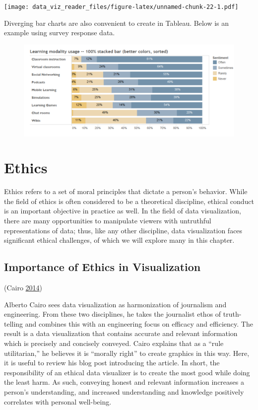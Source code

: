 \documentclass[]{book}
\theoremstyle{definition}
\theoremstyle{definition}
\theoremstyle{definition}
\theoremstyle{remark}
\begin{document}
\texttt{[image: data\_viz\_reader\_files/figure-latex/unnamed-chunk-22-1.pdf]}

Diverging bar charts are also convenient to create in Tableau. Below is
an example using survey response data.

\begin{figure}
\centering
\includegraphics{images/diverging_bar.png}
\caption{}
\end{figure}

\chapter{Ethics}\label{ethics}

Ethics refers to a set of moral principles that dictate a person's
behavior. While the field of ethics is often considered to be a
theoretical discipline, ethical conduct is an important objective in
practice as well. In the field of data visualization, there are many
opportunities to manipulate viewers with untruthful representations of
data; thus, like any other discipline, data visualization faces
significant ethical challenges, of which we will explore many in this
chapter.

\section{Importance of Ethics in
Visualization}\label{importance-of-ethics-in-visualization}

(Cairo \protect\hyperlink{ref-ethical_infographics}{2014})

Alberto Cairo sees data visualization as harmonization of journalism and
engineering. From these two disciplines, he takes the journalist ethos
of truth-telling and combines this with an engineering focus on efficacy
and efficiency. The result is a data visualization that contains
accurate and relevant information which is precisely and concisely
conveyed. Cairo explains that as a ``rule utilitarian,'' he believes it
is ``morally right'' to create graphics in this way. Here, it is useful
to review his blog post introducing the article. In short, the
responsibility of an ethical data visualizer is to create the most good
while doing the least harm. As such, conveying honest and relevant
information increases a person's understanding, and increased
understanding and knowledge positively correlates with personal
well-being.
\end{document}

